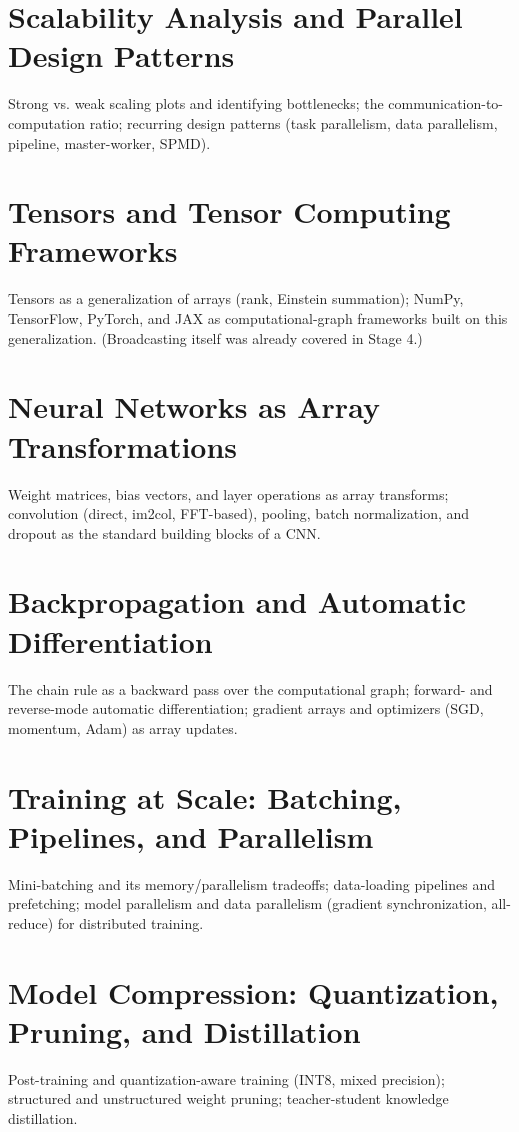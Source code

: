 \chapter{Scalability Analysis and Parallel Design Patterns}
Strong vs. weak scaling plots and identifying bottlenecks; the communication-to-computation ratio; recurring design patterns (task parallelism, data parallelism, pipeline, master-worker, SPMD).


\chapter{Tensors and Tensor Computing Frameworks}
Tensors as a generalization of arrays (rank, Einstein summation); NumPy, TensorFlow, PyTorch, and JAX as computational-graph frameworks built on this generalization. (Broadcasting itself was already covered in Stage 4.)

\chapter{Neural Networks as Array Transformations}
Weight matrices, bias vectors, and layer operations as array transforms; convolution (direct, im2col, FFT-based), pooling, batch normalization, and dropout as the standard building blocks of a CNN.

\chapter{Backpropagation and Automatic Differentiation}
The chain rule as a backward pass over the computational graph; forward- and reverse-mode automatic differentiation; gradient arrays and optimizers (SGD, momentum, Adam) as array updates.

\chapter{Training at Scale: Batching, Pipelines, and Parallelism}
Mini-batching and its memory/parallelism tradeoffs; data-loading pipelines and prefetching; model parallelism and data parallelism (gradient synchronization, all-reduce) for distributed training.

\chapter{Model Compression: Quantization, Pruning, and Distillation}
Post-training and quantization-aware training (INT8, mixed precision); structured and unstructured weight pruning; teacher-student knowledge distillation.


